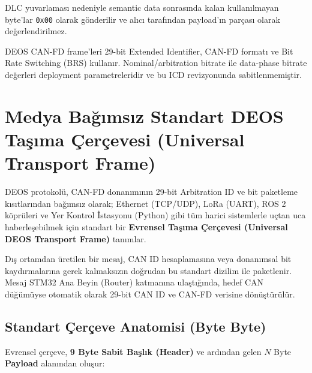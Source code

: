 \documentclass[a4paper,10pt]{article}
\newcommand{\hex}[1]{\texttt{0x#1}}
\begin{document}
DLC yuvarlaması nedeniyle semantic data sonrasında kalan kullanılmayan byte'lar \hex{00}
olarak gönderilir ve alıcı tarafından payload'ın parçası olarak değerlendirilmez.

DEOS CAN-FD frame'leri 29-bit Extended Identifier, CAN-FD formatı ve Bit Rate Switching
(BRS) kullanır. Nominal/arbitration bitrate ile data-phase bitrate değerleri deployment
parametreleridir ve bu ICD revizyonunda sabitlenmemiştir.

\section{Medya Bağımsız Standart DEOS Taşıma Çerçevesi (Universal Transport Frame)}

DEOS protokolü, CAN-FD donanımının 29-bit Arbitration ID ve bit paketleme kısıtlarından bağımsız olarak; Ethernet (TCP/UDP), LoRa (UART), ROS 2 köprüleri ve Yer Kontrol İstasyonu (Python) gibi tüm harici sistemlerle uçtan uca haberleşebilmek için standart bir \textbf{Evrensel Taşıma Çerçevesi (Universal DEOS Transport Frame)} tanımlar.

Dış ortamdan üretilen bir mesaj, CAN ID hesaplamasına veya donanımsal bit kaydırmalarına gerek kalmaksızın doğrudan bu standart dizilim ile paketlenir. Mesaj STM32 Ana Beyin (Router) katmanına ulaştığında, hedef CAN düğümüyse otomatik olarak 29-bit CAN ID ve CAN-FD verisine dönüştürülür.

\subsection{Standart Çerçeve Anatomisi (Byte Byte)}

Evrensel çerçeve, \textbf{9 Byte Sabit Başlık (Header)} ve ardından gelen $N$ Byte \textbf{Payload} alanından oluşur:
\end{document}
